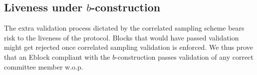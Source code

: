 

\subsection{Liveness under $b$-construction} \label{Liveness}
The extra validation process dictated by the correlated sampling scheme bears risk to the liveness of the protocol. Blocks that would have passed validation might get rejected once correlated sampling validation is enforced. We thus prove that an Eblock compliant with the $b$-construction passes validation of any correct committee member w.o.p.

